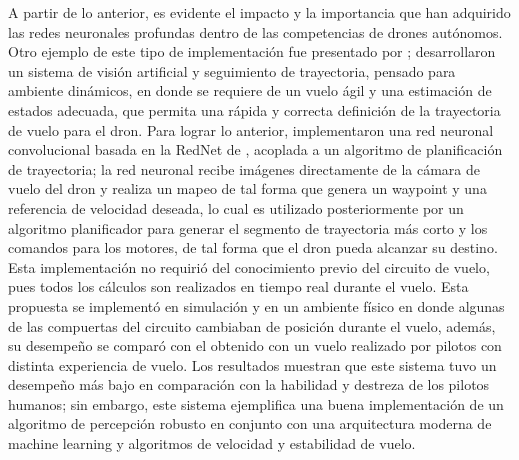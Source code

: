 A partir de lo anterior, es evidente el impacto y la importancia que han adquirido las redes neuronales profundas dentro de las competencias de drones autónomos. Otro ejemplo de este tipo de implementación fue presentado por \citet{kaufmann2018deep};  desarrollaron un sistema de visión artificial y seguimiento de trayectoria, pensado para ambiente dinámicos, en donde se requiere de un vuelo ágil y una estimación de estados adecuada, que permita una rápida y correcta definición de la trayectoria de vuelo para el dron. 
Para lograr lo anterior, implementaron una red neuronal convolucional basada en la RedNet de \citet{loquercio2018dronet}, acoplada a un algoritmo de planificación de trayectoria; la red neuronal recibe imágenes directamente de la cámara de vuelo del dron y realiza un mapeo de tal forma que genera un waypoint y una referencia de velocidad deseada, lo cual es utilizado posteriormente por un algoritmo planificador para generar el segmento de trayectoria más corto y los comandos para los motores, de tal forma que el dron pueda alcanzar su destino. Esta implementación no requirió del conocimiento previo del circuito de vuelo, pues todos los cálculos son realizados en tiempo real durante el vuelo. Esta propuesta se implementó en simulación y en un ambiente físico en donde algunas de las compuertas del circuito cambiaban de posición durante el vuelo, además, su desempeño se comparó con el obtenido con un vuelo realizado por pilotos con distinta experiencia de vuelo. Los resultados muestran que este sistema tuvo un desempeño más bajo en comparación con la habilidad y destreza de los pilotos humanos; sin embargo, este sistema ejemplifica una buena implementación de un algoritmo de percepción robusto en conjunto con una arquitectura moderna de machine learning y algoritmos de velocidad y estabilidad de vuelo. 

